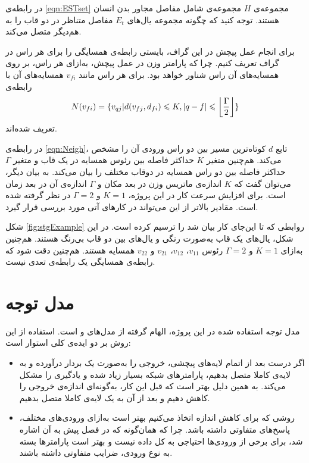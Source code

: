 در رابطه‌ی \ref{eqn:ESTset} مجموعه‌ی $H$ مجموعه‌ی شامل مفاصل مجاور بدن انسان هستند. توجه کنید که چگونه مجموعه یال‌های $E_t$ مفاصل متناظر در دو قاب را به هم‌دیگر متصل می‌کند. 

برای انجام عمل پیچش در این گراف، بایستی رابطه‌ی همسایگی را برای هر راس در گراف تعریف کنیم. چرا که پارامتر وزن در عمل پیچش، به‌ازای هر راس، بر روی همسایه‌های آن راس شناور خواهد بود. برای هر راس مانند $v_{fi}$ همسایه‌های آن با رابطه‌ی 
\begin{equation}\label{eqn:Neigh}
	N(v_{fi}) = \{v_{qj}|d(v_{fj}, d_{fi})\leqslant K, |q-f|\leqslant \left\lfloor{\frac{\Gamma}{2}}\right\rfloor \}
\end{equation}
تعریف شده‌اند.\cite{st-gcn}

در رابطه‌ی \ref{eqn:Neigh}، تابع $d$  کوتاه‌ترین مسیر بین دو راس ورودی آن را مشخص می‌کند. هم‌چنین متغیر $K$ حداکثر فاصله بین رئوس همسایه در یک قاب و متغیر $\Gamma$ حداکثر فاصله‌ بین دو راس همسایه در دوقاب مختلف را بیان می‌کند. به بیان دیگر، می‌توان گفت که $K$ اندازه‌ی ماتریس وزن در بعد مکان و $\Gamma$ اندازه‌ی آن در بعد زمان است. برای افزایش سرعت کار در این پروژه، $K = 1$ و $\Gamma = 2$ در نظر گرفته شده است. مقادیر بالاتر از این می‌تواند در کارهای آتی مورد بررسی قرار گیرد. 

شکل \ref{fig:stgExample} روابطی که تا این‌جای کار بیان شد را ترسیم کرده است. در این شکل، یال‌های یک قاب به‌صورت رنگی و یال‌های بین دو قاب بی‌رنگ هستند. هم‌چنین به‌ازای $K = 1$ و $\Gamma = 2$ رئوس $v_{11}$، $v_{12}$، $v_{21}$ و $v_{22}$ همسایه هستند. هم‌چنین دقت شود که رابطه‌ی همسایگی یک رابطه‌ی تعدی نیست.


\section{مدل توجه}
مدل توجه استفاده شده در این پروژه، الهام گرفته از مدل‌های \cite{attention_pooling_main} و \cite{attention_pooling} است. استفاده از این روش بر دو ایده‌ی کلی استوار است:
\begin{itemize}
\item اگر درست بعد از اتمام لایه‌های پیچشی، خروجی را به‌صورت یک بردار درآورده و به لایه‌ی کاملا متصل بدهیم، پارامترهای شبکه‌ بسیار زیاد شده و یادگیری را مشکل می‌کند. به همین دلیل بهتر است که قبل این کار، به‌گونه‌ای اندازه‌ی خروجی را کاهش دهیم و بعد از آن به یک لایه‌ی کاملا متصل بدهیم.\cite{attention_pooling}
\item روشی که برای کاهش اندازه اتخاذ می‌کنیم بهتر است به‌ازای ورودی‌های مختلف، پاسخ‌های متفاوتی داشته باشد. چرا که همان‌گونه که در فصل پیش به آن اشاره شد، برای برخی از ورودی‌ها احتیاجی به کل داده نیست و بهتر است پارامترها بسته به نوع ورودی، ضرایب متفاوتی داشته باشند.  
\end{itemize}

